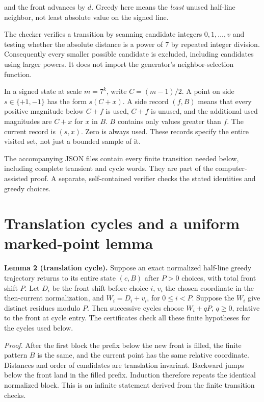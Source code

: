 \documentclass[11pt,a4paper]{article}
\begin{document}
and the front advances by $d$. Greedy here means the \emph{least} unused half-line neighbor, not least absolute value on the signed line.

The checker verifies a transition by scanning candidate integers $0,1,\ldots,v$ and testing whether the absolute distance is a power of 7 by repeated integer division. Consequently every smaller possible candidate is excluded, including candidates using larger powers. It does not import the generator's neighbor-selection function.

In a signed state at scale $m=7^k$, write $C=(m-1)/2$. A point on side $s\in\{+1,-1\}$ has the form $s(C+x)$. A side record $(f,B)$ means that every positive magnitude below $C+f$ is used, $C+f$ is unused, and the additional used magnitudes are $C+x$ for $x$ in $B$. $B$ contains only values greater than $f$. The current record is $(s,x)$. Zero is always used. These records specify the entire visited set, not just a bounded sample of it.

The accompanying JSON files contain every finite transition needed below, including complete transient and cycle words. They are part of the computer-assisted proof. A separate, self-contained verifier checks the stated identities and greedy choices.

\section{Translation cycles and a uniform marked-point lemma}
\label{sec:3}

\noindent\textbf{Lemma 2 (translation cycle).} Suppose an exact normalized
half-line greedy trajectory returns to its entire state $(c,B)$ after
$P>0$ choices, with total front shift $P$. Let $D_i$ be the front shift
before choice $i$, $v_i$ the chosen coordinate in the then-current
normalization, and $W_i=D_i+v_i$, for $0\le i<P$. Suppose the $W_i$ give
distinct residues modulo $P$. Then successive cycles choose $W_i+qP$,
$q\ge0$, relative to the front at cycle entry. The certificates check all
these finite hypotheses for the cycles used below.

\emph{Proof.} After the first block the prefix below the new front is filled, the finite pattern $B$ is the same, and the current point has the same relative coordinate. Distances and order of candidates are translation invariant. Backward jumps below the front land in the filled prefix. Induction therefore repeats the identical normalized block. This is an infinite statement derived from the finite transition checks.
\end{document}
